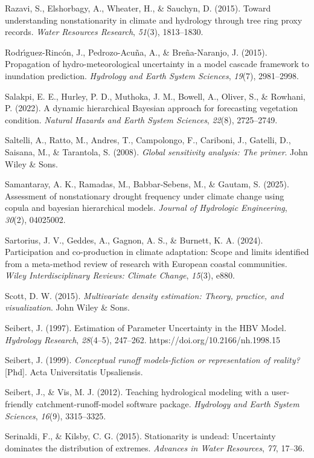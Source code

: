 \documentclass[
]{article}
\begin{document}
Razavi, S., Elshorbagy, A., Wheater, H., \& Sauchyn, D. (2015). Toward
understanding nonstationarity in climate and hydrology through tree ring
proxy records. \emph{Water Resources Research}, \emph{51}(3),
1813--1830.

Rodrı́guez-Rincón, J., Pedrozo-Acuña, A., \& Breña-Naranjo, J. (2015).
Propagation of hydro-meteorological uncertainty in a model cascade
framework to inundation prediction. \emph{Hydrology and Earth System
Sciences}, \emph{19}(7), 2981--2998.

Salakpi, E. E., Hurley, P. D., Muthoka, J. M., Bowell, A., Oliver, S.,
\& Rowhani, P. (2022). A dynamic hierarchical Bayesian approach for
forecasting vegetation condition. \emph{Natural Hazards and Earth System
Sciences}, \emph{22}(8), 2725--2749.

Saltelli, A., Ratto, M., Andres, T., Campolongo, F., Cariboni, J.,
Gatelli, D., Saisana, M., \& Tarantola, S. (2008). \emph{Global
sensitivity analysis: The primer}. John Wiley \& Sons.

Samantaray, A. K., Ramadas, M., Babbar-Sebens, M., \& Gautam, S. (2025).
Assessment of nonstationary drought frequency under climate change using
copula and bayesian hierarchical models. \emph{Journal of Hydrologic
Engineering}, \emph{30}(2), 04025002.

Sartorius, J. V., Geddes, A., Gagnon, A. S., \& Burnett, K. A. (2024).
Participation and co-production in climate adaptation: Scope and limits
identified from a meta-method review of research with European coastal
communities. \emph{Wiley Interdisciplinary Reviews: Climate Change},
\emph{15}(3), e880.

Scott, D. W. (2015). \emph{Multivariate density estimation: Theory,
practice, and visualization}. John Wiley \& Sons.

Seibert, J. (1997). Estimation of Parameter Uncertainty in the HBV
Model. \emph{Hydrology Research}, \emph{28}(4--5), 247--262.
https://doi.org/10.2166/nh.1998.15

Seibert, J. (1999). \emph{Conceptual runoff models-fiction or
representation of reality?} {[}Phd{]}. Acta Universitatis Upsaliensis.

Seibert, J., \& Vis, M. J. (2012). Teaching hydrological modeling with a
user-friendly catchment-runoff-model software package. \emph{Hydrology
and Earth System Sciences}, \emph{16}(9), 3315--3325.

Serinaldi, F., \& Kilsby, C. G. (2015). Stationarity is undead:
Uncertainty dominates the distribution of extremes. \emph{Advances in
Water Resources}, \emph{77}, 17--36.
\end{document}
